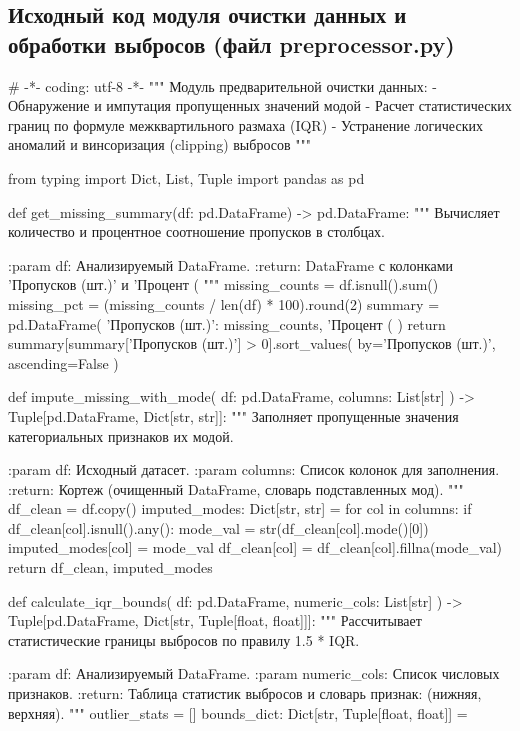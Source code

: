\documentclass[14pt,a4paper]{extarticle}
\begin{document}
\clearpage
\subsection{Исходный код модуля очистки данных и обработки выбросов (файл preprocessor.py)}
\begin{CodeListing}
# -*- coding: utf-8 -*-
"""
Модуль предварительной очистки данных:
- Обнаружение и импутация пропущенных значений модой
- Расчет статистических границ по формуле межквартильного размаха (IQR)
- Устранение логических аномалий и винсоризация (clipping) выбросов
"""

from typing import Dict, List, Tuple
import pandas as pd


def get_missing_summary(df: pd.DataFrame) -> pd.DataFrame:
    """
    Вычисляет количество и процентное соотношение пропусков в столбцах.

    :param df: Анализируемый DataFrame.
    :return: DataFrame с колонками 'Пропусков (шт.)' и 'Процент (%
    """
    missing_counts = df.isnull().sum()
    missing_pct = (missing_counts / len(df) * 100).round(2)
    summary = pd.DataFrame({
        'Пропусков (шт.)': missing_counts,
        'Процент (%
    })
    return summary[summary['Пропусков (шт.)'] > 0].sort_values(
        by='Пропусков (шт.)', ascending=False
    )


def impute_missing_with_mode(
    df: pd.DataFrame, columns: List[str]
) -> Tuple[pd.DataFrame, Dict[str, str]]:
    """
    Заполняет пропущенные значения категориальных признаков их модой.

    :param df: Исходный датасет.
    :param columns: Список колонок для заполнения.
    :return: Кортеж (очищенный DataFrame, словарь подставленных мод).
    """
    df_clean = df.copy()
    imputed_modes: Dict[str, str] = {}
    for col in columns:
        if df_clean[col].isnull().any():
            mode_val = str(df_clean[col].mode()[0])
            imputed_modes[col] = mode_val
            df_clean[col] = df_clean[col].fillna(mode_val)
    return df_clean, imputed_modes


def calculate_iqr_bounds(
    df: pd.DataFrame, numeric_cols: List[str]
) -> Tuple[pd.DataFrame, Dict[str, Tuple[float, float]]]:
    """
    Рассчитывает статистические границы выбросов по правилу 1.5 * IQR.

    :param df: Анализируемый DataFrame.
    :param numeric_cols: Список числовых признаков.
    :return: Таблица статистик выбросов и словарь {признак: (нижняя, верхняя)}.
    """
    outlier_stats = []
    bounds_dict: Dict[str, Tuple[float, float]] = {}


\end{CodeListing}
\end{document}

